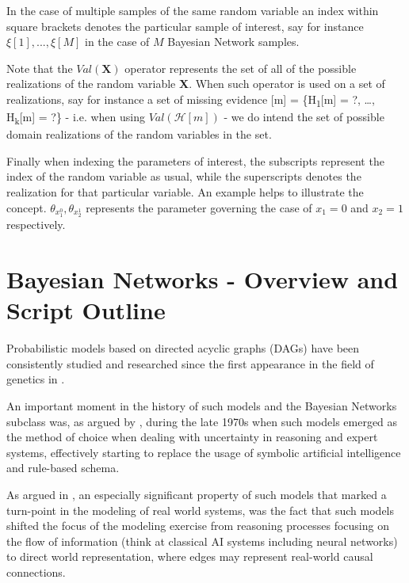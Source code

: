\documentclass[11pt]{article}
\begin{document}
\begin{article}
In the case of multiple samples of the same random variable an index
within square brackets denotes the particular sample of interest, say
for instance \(\xi[1], ..., \xi[M]\) in the case of \(M\) Bayesian Network
samples.

Note that the \(Val(\textbf{X})\) operator represents the set of all of
the possible realizations of the random variable \textbf{X}. When such
operator is used on a set of realizations, say for instance a set of
missing evidence [m] = \{H\textsubscript{1}[m] = ?, \ldots{}, H\textsubscript{k}[m] = ?\} -
i.e. when using \(Val (\mathcal{H}[m])\) - we do intend the set of
possible domain realizations of the random variables in the set.

Finally when indexing the parameters of interest, the
subscripts represent the index of the random variable as usual, while
the superscripts denotes the realization for that particular
variable. An example helps to illustrate the concept. \(\theta_{x_1^0},
\theta_{x_2^1}\) represents the parameter governing the case of \(x_1 =
0\) and \(x_2 = 1\) respectively.

\newpage


\section{Bayesian Networks - Overview and Script Outline}
\label{sec:org249e271}

Probabilistic models based on directed acyclic graphs (DAGs) have
been consistently studied and researched since the first appearance
in the field of genetics in \cite{wright1921correlation}.

An important moment in the history of such models and the Bayesian
Networks subclass was, as argued by \cite{pearl2011bayesian}, during
the late 1970s when such models emerged as the method of choice when
dealing with uncertainty in reasoning and expert systems,
effectively starting to replace the usage of symbolic artificial
intelligence and rule-based schema.

As argued in \cite{pearl2011bayesian}, an especially significant
property of such models that marked a turn-point in the modeling of
real world systems, was the fact that such models shifted the focus
of the modeling exercise from reasoning processes focusing on the
flow of information (think at classical AI systems including neural
networks) to direct world representation, where edges may represent
real-world causal connections.


\end{article}
\end{document}
